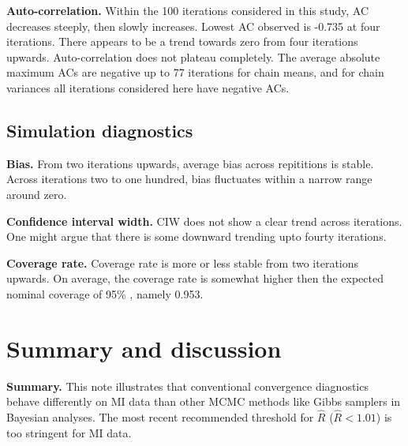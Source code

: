 \documentclass[article]{jss}
\begin{document}
\textbf{Auto-correlation.} Within the 100 iterations considered in this study, AC decreases steeply, then slowly increases. Lowest AC observed is -0.735 at four iterations. There appears to be a trend towards zero from four iterations upwards. Auto-correlation does not plateau completely. The average absolute maximum ACs are negative up to 77 iterations for chain means, and for chain variances all iterations considered here have negative ACs.


\subsection{Simulation diagnostics}
\textbf{Bias.} From two iterations upwards, average bias across repititions is stable. Across iterations two to one hundred, bias fluctuates within a narrow range around zero. 

\textbf{Confidence interval width.} CIW does not show a clear trend across iterations. One might argue that there is some downward trending upto fourty iterations. %

\textbf{Coverage rate.} Coverage rate is more or less stable from two iterations upwards. On average, the coverage rate is somewhat higher then the expected nominal coverage of 95\% \cite{neym43}, namely 0.953. 


\section{Summary and discussion} \label{sec:summary}

\textbf{Summary.}
This note illustrates that conventional convergence diagnostics behave differently on MI data than other MCMC methods like Gibbs samplers in Bayesian analyses. The most recent recommended threshold for $\widehat{R}$ ($\widehat{R} < 1.01$) is too stringent for MI data.
\end{document}
